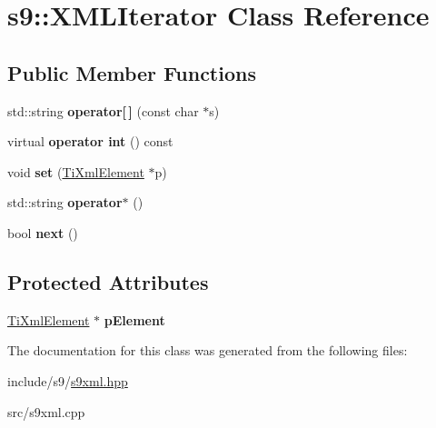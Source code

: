 \hypertarget{classs9_1_1XMLIterator}{\section{s9\-:\-:X\-M\-L\-Iterator Class Reference}
\label{classs9_1_1XMLIterator}
}
\subsection*{Public Member Functions}
\begin{DoxyCompactItemize}
\item 
\hypertarget{classs9_1_1XMLIterator_a8e6c3bfbbf48c80d5a0600bb037a08c2}{std\-::string {\bfseries operator\mbox{[}$\,$\mbox{]}} (const char $\ast$s)}\label{classs9_1_1XMLIterator_a8e6c3bfbbf48c80d5a0600bb037a08c2}

\item 
\hypertarget{classs9_1_1XMLIterator_a128e571d94d1518d3285a2265b49b296}{virtual {\bfseries operator int} () const }\label{classs9_1_1XMLIterator_a128e571d94d1518d3285a2265b49b296}

\item 
\hypertarget{classs9_1_1XMLIterator_afe47290dd4e84f7f6c5638394a84a665}{void {\bfseries set} (\hyperlink{classTiXmlElement}{Ti\-Xml\-Element} $\ast$p)}\label{classs9_1_1XMLIterator_afe47290dd4e84f7f6c5638394a84a665}

\item 
\hypertarget{classs9_1_1XMLIterator_a7cfd35c3a47c3819c78ea5d43381f762}{std\-::string {\bfseries operator$\ast$} ()}\label{classs9_1_1XMLIterator_a7cfd35c3a47c3819c78ea5d43381f762}

\item 
\hypertarget{classs9_1_1XMLIterator_ad3381f5be098ca5155a14aedda1f3496}{bool {\bfseries next} ()}\label{classs9_1_1XMLIterator_ad3381f5be098ca5155a14aedda1f3496}

\end{DoxyCompactItemize}
\subsection*{Protected Attributes}
\begin{DoxyCompactItemize}
\item 
\hypertarget{classs9_1_1XMLIterator_a24844758c192fee227856c853db888b1}{\hyperlink{classTiXmlElement}{Ti\-Xml\-Element} $\ast$ {\bfseries p\-Element}}\label{classs9_1_1XMLIterator_a24844758c192fee227856c853db888b1}

\end{DoxyCompactItemize}


The documentation for this class was generated from the following files\-:\begin{DoxyCompactItemize}
\item 
include/s9/\hyperlink{s9xml_8hpp}{s9xml.\-hpp}\item 
src/s9xml.\-cpp\end{DoxyCompactItemize}
